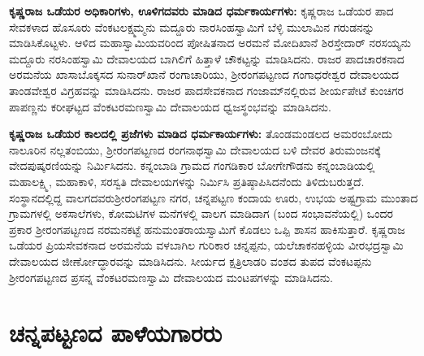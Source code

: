 \textbf{ಕೃಷ್ಣರಾಜ ಒಡೆಯರ ಅಧಿಕಾರಿಗಳು, ಊಳಿಗದವರು ಮಾಡಿದ ಧರ್ಮಕಾರ್ಯಗಳು: } ಕೃಷ್ಣರಾಜ ಒಡೆಯರ ಪಾದ ಸೇವಕಳಾದ ಹೊಸೂರು ವೆಂಕಟಲಕ್ಷ್ಮಮ್ಮನು ಮದ್ದೂರು ನಾರಸಿಂಹಸ್ವಾಮಿಗೆ ಬೆಳ್ಳಿ ಮುಲಾಮಿನ ಗರುಡನನ್ನು ಮಾಡಿಸಿ\-ಕೊಟ್ಟಳು. ಆಳಿದ ಮಹಾಸ್ವಾಮಿಯವರಿಂದ ಪೋಷಿತನಾದ ಅರಮನೆ ಮೋದಿಖಾನೆ ಶಿರಸ್ತೇದಾರ್​ ನರಸಯ್ಯನು ಮದ್ದೂರು ನರಸಿಂಹಸ್ವಾಮಿ ದೇವಾಲಯದ ಬಾಗಿಲಿಗೆ ಹಿತ್ತಾಳೆ ಚೌಕಟ್ಟನ್ನು ಮಾಡಿಸಿದನು. ರಾಜರ ಪಾದಚಾರಕನಾದ ಅರಮನೆಯ ಖಾಸಾಬೊಕ್ಕಸದ ಸುನಾರ್​ಖಾನೆ ರಂಗಾಚಾರಿಯು, ಶ‍್ರೀರಂಗಪಟ್ಟಣದ ಗಂಗಾಧರೇಶ್ವರ ದೇವಾಲಯದ ತಾಂಡವೇಶ್ವರ ವಿಗ್ರಹವನ್ನು ಮಾಡಿಸಿದನು. ರಾಜರ ಪಾದಸೇವಕನಾದ ಗಂಜಾಮ್‌ನಲ್ಲಿರುವ ಶೀರ್ಯಪೇಟೆ ಕುಂಚಿಗರ ಪಾಪಣ್ಣನು ಕರೀಘಟ್ಟದ ವೆಂಕಟರಮಣಸ್ವಾಮಿ ದೇವಾಲಯದ ಧ್ವಜಸ್ಥಂಭವನ್ನು ಮಾಡಿಸಿದನು.

\textbf{ಕೃಷ್ಣರಾಜ ಒಡೆಯರ ಕಾಲದಲ್ಲಿ ಪ್ರಜೆಗಳು ಮಾಡಿದ ಧರ್ಮಕಾರ್ಯಗಳು: } ತೊಂಡಮಂಡಲದ ಅಮರಂಬೋದು ನಾಲೂರಿನ ನಲ್ಲತಂಬಿಯು, ಶ‍್ರೀರಂಗಪಟ್ಟಣದ ರಂಗನಾಥಸ್ವಾಮಿ ದೇವಾಲಯದ ಬಳಿ ದೇವರ ತಿರುಮಂಜನಕ್ಕೆ ವೇದಪುಷ್ಕರಣಿ\-ಯನ್ನು ನಿರ್ಮಿಸಿದನು. ಕನ್ನಂಬಾಡಿ ಗ್ರಾಮದ ಗಂಗಡಿಕಾರ ಬೋಗೇಗೌಡನು ಕನ್ನಂಬಾಡಿಯಲ್ಲಿ ಮಹಾಲಕ್ಷ್ಮಿ, ಮಹಾಕಾಳಿ, ಸರಸ್ವತಿ ದೇವಾಲಯಗಳನ್ನು ನಿರ್ಮಿಸಿ ಪ್ರತಿಷ್ಠಾಪಿಸಿದನೆಂದು ತಿಳಿದುಬರುತ್ತದೆ. ಸಂಸ್ಥಾನದಲ್ಲಿದ್ದ ವಾಲಗದವರು\break ಶ‍್ರೀರಂಗಪಟ್ಟಣ ನಗರ, ಚನ್ನಪಟ್ಟಣ ಕಂದಾಯ ಊರು, ಉಭಯ ಅಷ್ಟಗ್ರಾಮ ಮುಂತಾದ ಗ್ರಾಮಗಳಲ್ಲಿ ಅಕಸಾಲೆಗಳು, ಕೋಮಟಿಗಳ ಮನೆಗಳಲ್ಲಿ ವಾಲಗ ಮಾಡಿದಾಗ (ಬಂದ ಸಂಭಾವನೆಯಲ್ಲಿ) ಒಂದರ ಪ್ರಕಾರ ಶ‍್ರೀರಂಗಪಟ್ಟಣದ ನರಮನಕಟ್ಟೆ ಹನುಮಂತರಾಯಸ್ವಾಮಿಗೆ ಕೊಡಲು ಒಪ್ಪಿ ಶಾಸನ ಹಾಕಿಸುತ್ತಾರೆ. ಕೃಷ್ಣರಾಜ ಒಡೆಯರ ಪ್ರಿಯಸೇವಕನಾದ ಅರಮನೆಯ ವಳಬಾಗಿಲ ಗುರಿಕಾರ ಚನ್ನಪ್ಪನು, ಯಲೆಚಾಕನಹಳ್ಳಿಯ ವೀರಭದ್ರಸ್ವಾಮಿ ದೇವಾಲಯದ ಜೀರ್ಣೋದ್ಧಾರವನ್ನು ಮಾಡಿಸಿ\-ದನು. ಸೀರ್ಯದ ಕ್ಷತ್ರಿಲಾಡರಿ ವಂಶದ ತುಪದ ವೆಂಕಟಪ್ಪನು ಶ‍್ರೀರಂಗಪಟ್ಟಣದ ಪ್ರಸನ್ನ ವೆಂಕಟರಮಣಸ್ವಾಮಿ ದೇವಾಲಯದ ಮಂಟಪಗಳನ್ನು ಮಾಡಿಸಿದನು.


\section{ಚನ್ನಪಟ್ಟಣದ ಪಾಳೆಯಗಾರರು}

